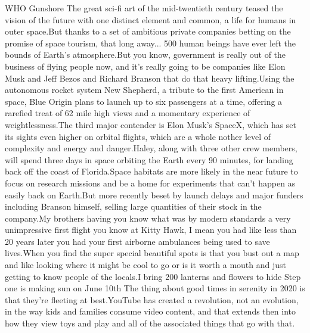 \documentclass{article}%
\begin{document}
WHO Gunshore The great sci{-}fi art of the mid{-}twentieth century teased the vision of the future with one distinct element and common, a life for humans in outer space.But thanks to a set of ambitious private companies betting on the promise of space tourism, that long away...  500 human beings have ever left the bounds of Earth's atmosphere.But you know, government is really out of the business of flying people now, and it's really going to be companies like Elon Musk and Jeff Bezos and Richard Branson that do that heavy lifting.Using the autonomous rocket system New Shepherd, a tribute to the first American in space, Blue Origin plans to launch up to six passengers at a time, offering a rarefied treat of 62 mile high views and a momentary experience of weightlessness.The third major contender is Elon Musk's SpaceX, which has set its sights even higher on orbital flights, which are a whole nother level of complexity and energy and danger.Haley, along with three other crew members, will spend three days in space orbiting the Earth every 90 minutes, for landing back off the coast of Florida.Space habitats are more likely in the near future to focus on research missions and be a home for experiments that can't happen as easily back on Earth.But more recently beset by launch delays and major funders including Branson himself, selling large quantities of their stock in the company.My brothers having you know what was by modern standards a very unimpressive first flight you know at Kitty Hawk, I mean you had like less than 20 years later you had your first airborne ambulances being used to save lives.When you find the super special beautiful spots is that you bust out a map and like looking where it might be cool to go or is it worth a mouth and just getting to know people of the locals.I bring 200 lanterns and flowers to hide Step one is making sun on June 10th The thing about good times in serenity in 2020 is that they're fleeting at best.YouTube has created a revolution, not an evolution, in the way kids and families consume video content, and that extends then into how they view toys and play and all of the associated things that go with that.%
\end{document}
